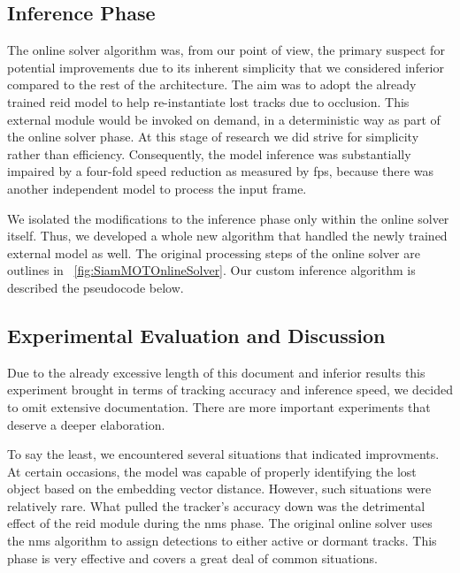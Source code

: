 \subsection{Inference Phase}

The online solver algorithm was, from our point of view, the primary suspect for potential improvements due to its inherent simplicity that we considered inferior compared to the rest of the architecture. The aim was to adopt the already trained \gls{reid} model to help re-instantiate lost tracks due to occlusion. This external module would be invoked on demand, in a deterministic way as part of the online solver phase. At this stage of research we did strive for simplicity rather than efficiency. Consequently, the model inference was substantially impaired by a four-fold speed reduction as measured by \gls{fps}, because there was another independent model to process the input frame.

We isolated the modifications to the inference phase only within the online solver itself. Thus, we developed a whole new algorithm that handled the newly trained external model as well. The original processing steps of the online solver are outlines in \figtext{}~\ref{fig:SiamMOTOnlineSolver}. Our custom inference algorithm is described the pseudocode below.


\subsection{Experimental Evaluation and Discussion}

Due to the already excessive length of this document and inferior results this experiment brought in terms of tracking accuracy and inference speed, we decided to omit extensive documentation. There are more important experiments that deserve a deeper elaboration.

To say the least, we encountered several situations that indicated improvments. At certain occasions, the model was capable of properly identifying the lost object based on the embedding vector distance. However, such situations were relatively rare. What pulled the tracker's accuracy down was the detrimental effect of the \gls{reid} module during the \gls{nms} phase. The original online solver uses the \gls{nms} algorithm to assign detections to either active or dormant tracks. This phase is very effective and covers a great deal of common situations.

